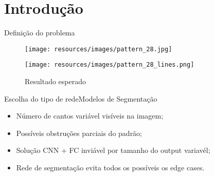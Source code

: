 \section{Introdução}
\begin{frame}{Definição do problema}

     \begin{figure}[ht]
            \begin{minipage}[b]{0.45\linewidth}
                \centering
                \texttt{[image: resources/images/pattern\_28.jpg]}
                \captionsetup{labelformat=empty}
                \caption{Imagem de entrada}
            \end{minipage}
            \hspace{0.5cm}
            \begin{minipage}[b]{0.45\linewidth}
                \centering
                \texttt{[image: resources/images/pattern\_28\_lines.png]}
                \captionsetup{labelformat=empty}
                \caption{Resultado esperado}
            \end{minipage}
        \end{figure}
    
\end{frame}

\begin{frame}[c]{Escolha do tipo de rede}{Modelos de Segmentação}

  \begin{center}
    \begin{minipage}{0.7\textwidth}
      \begin{itemize}
      \Large
      \item<1-> Número de cantos variável visíveis na imagem;
      \item<1-> Possíveis obstruções parciais do padrão;
      \item<2-> Solução CNN + FC inviável por tamanho do output variavél;
      \item<3-> Rede de segmentação evita todos os possíveis os edge cases.
      \end{itemize}
    \end{minipage}
  \end{center}

    
  \end{frame}


